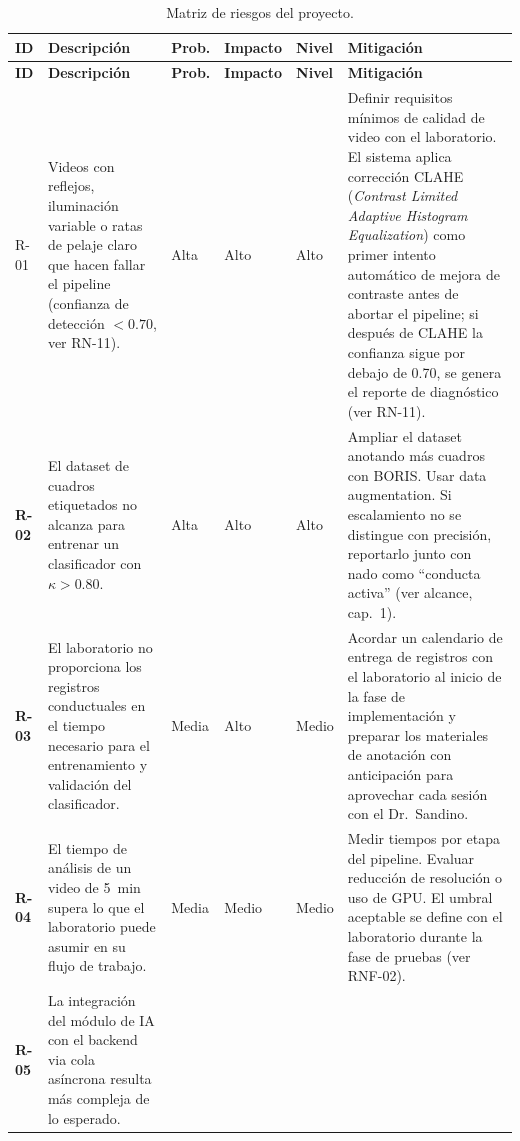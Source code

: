 \begin{longtable}{|>{\bfseries}p{0.9cm}|p{3.4cm}|p{1.3cm}|p{1.2cm}|p{1.1cm}|p{4.6cm}|}
\caption{Matriz de riesgos del proyecto.
\label{tab:riesgos}}\\
\hline
\textbf{ID} & \textbf{Descripción} & \textbf{Prob.} & \textbf{Impacto} & \textbf{Nivel} & \textbf{Mitigación} \\
\hline
\endfirsthead
\hline
\textbf{ID} & \textbf{Descripción} & \textbf{Prob.} & \textbf{Impacto} & \textbf{Nivel} & \textbf{Mitigación} \\
\hline
\endhead
\hline
\endfoot

R-01 & Videos con reflejos, iluminación variable o ratas de pelaje claro que hacen
      fallar el pipeline (confianza de detección $< 0.70$, ver RN-11).
    & Alta & Alto & Alto
    & Definir requisitos mínimos de calidad de video con el laboratorio. El sistema
      aplica corrección CLAHE (\textit{Contrast Limited Adaptive Histogram
      Equalization}) \cite{bradski2000} como primer intento automático de mejora
      de contraste antes de abortar el pipeline; si después de CLAHE la confianza
      sigue por debajo de 0.70, se genera el reporte de diagnóstico (ver RN-11). \\
\hline
R-02 & El dataset de cuadros etiquetados no alcanza para entrenar un clasificador
      con $\kappa > 0.80$.
    & Alta & Alto & Alto
    & Ampliar el dataset anotando más cuadros con BORIS. Usar data augmentation.
      Si escalamiento no se distingue con precisión, reportarlo junto con nado
      como ``conducta activa'' (ver alcance, cap.~1). \\
\hline
R-03 & El laboratorio no proporciona los registros conductuales en el tiempo
      necesario para el entrenamiento y validación del clasificador.
    & Media & Alto & Medio
    & Acordar un calendario de entrega de registros con el laboratorio al inicio
      de la fase de implementación y preparar los materiales de anotación con
      anticipación para aprovechar cada sesión con el Dr.\ Sandino. \\
\hline
R-04 & El tiempo de análisis de un video de 5~min supera lo que el laboratorio
      puede asumir en su flujo de trabajo.
    & Media & Medio & Medio
    & Medir tiempos por etapa del pipeline. Evaluar reducción de resolución o
      uso de GPU. El umbral aceptable se define con el laboratorio durante la
      fase de pruebas (ver RNF-02). \\
\hline
R-05 & La integración del módulo de IA con el backend via cola asíncrona resulta
      más compleja de lo esperado.

\end{longtable}

